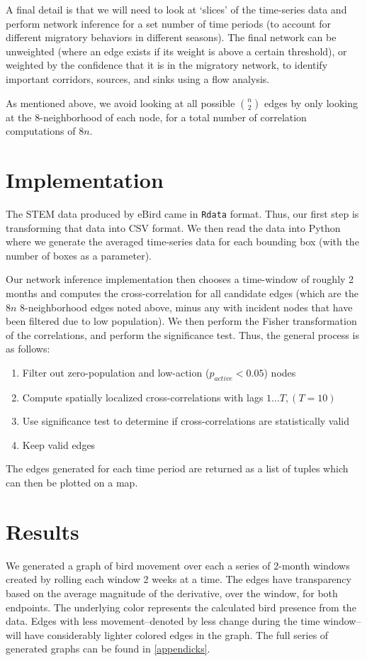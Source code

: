 \documentclass{article} %
\begin{document}
A final detail is that we will need to look at `slices' of the time-series data and perform network inference for a set number of time periods (to account for different migratory behaviors in different seasons). The final network can be unweighted (where an edge exists if its weight is above a certain threshold), or weighted by the confidence that it is in the migratory network, to identify important corridors, sources, and sinks using a flow analysis. 

As mentioned above, we avoid looking at all possible $n \choose 2$ edges by only looking at the 8-neighborhood of each node, for a total number of correlation computations of $8n$.

\section{Implementation}
The STEM data produced by eBird came in \texttt{Rdata} format. Thus, our first step is transforming that data into CSV format. We then read the data into Python where we generate the averaged time-series data for each bounding box (with the number of boxes as a parameter). 

Our network inference implementation then chooses a time-window of roughly 2 months and computes the cross-correlation for all candidate edges (which are the $8n$ 8-neighborhood edges noted above, minus any with incident nodes that have been filtered due to low population). We then perform the Fisher transformation of the correlations, and perform the significance test. Thus, the general process is as follows:

\begin{enumerate}
\item Filter out zero-population and low-action ($p_{active} < 0.05$) nodes
\item Compute spatially localized cross-correlations with lags $1\dots T, (T=10)$
\item Use significance test to determine if cross-correlations are statistically valid
\item Keep valid edges
\end{enumerate}

The edges generated for each time period are returned as a list of tuples which can then be plotted on a map.

\section{Results}
We generated a graph of bird movement over each a series of 2-month windows created by rolling each window 2 weeks at a time.
The edges have transparency based on the average magnitude of the derivative, over the window, for both endpoints.
The underlying color represents the calculated bird presence from the data.
Edges with less movement--denoted by less change during the time window--will have considerably lighter colored edges in the graph.
The full series of generated graphs can be found in \ref{appendicks}.
\end{document}
